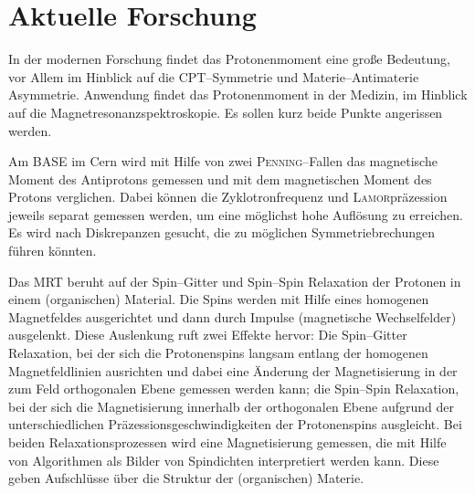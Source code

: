 \documentclass[sn-mathphys-num,iicol]{sn-jnl}
\theoremstyle{thmstyleone}
\theoremstyle{thmstyletwo}
\theoremstyle{thmstylethree}
\begin{document}
\section{Aktuelle Forschung}
In der modernen Forschung findet das Protonenmoment eine große Bedeutung, vor Allem im Hinblick auf die CPT--Symmetrie und Materie--Antimaterie Asymmetrie.
Anwendung findet das Protonenmoment in der Medizin, im Hinblick auf die Magnetresonanzspektroskopie.
Es sollen kurz beide Punkte angerissen werden.

Am BASE im Cern\cite{BASE2017} wird mit Hilfe von zwei \textsc{Penning}--Fallen das magnetische Moment des Antiprotons gemessen und mit dem magnetischen Moment des Protons verglichen.
Dabei können die Zyklotronfrequenz und \textsc{Lamor}präzession jeweils separat gemessen werden, um eine möglichst hohe Auflösung zu erreichen.
Es wird nach Diskrepanzen gesucht, die zu möglichen Symmetriebrechungen führen könnten.

Das MRT beruht auf der Spin--Gitter und Spin--Spin Relaxation der Protonen in einem (organischen) Material.
Die Spins werden mit Hilfe eines homogenen Magnetfeldes ausgerichtet und dann durch Impulse (magnetische Wechselfelder) ausgelenkt.
Diese Auslenkung ruft zwei Effekte hervor:
Die Spin--Gitter Relaxation, bei der sich die Protonenspins langsam entlang der homogenen Magnetfeldlinien ausrichten und dabei eine Änderung der Magnetisierung in der zum Feld orthogonalen Ebene gemessen werden kann;
die Spin--Spin Relaxation, bei der sich die Magnetisierung innerhalb der orthogonalen Ebene aufgrund der unterschiedlichen Präzessionsgeschwindigkeiten der Protonenspins ausgleicht.
Bei beiden Relaxationsprozessen wird eine Magnetisierung gemessen, die mit Hilfe von Algorithmen als Bilder von Spindichten interpretiert werden kann.
Diese geben Aufschlüsse über die Struktur der (organischen) Materie.


\end{document}
